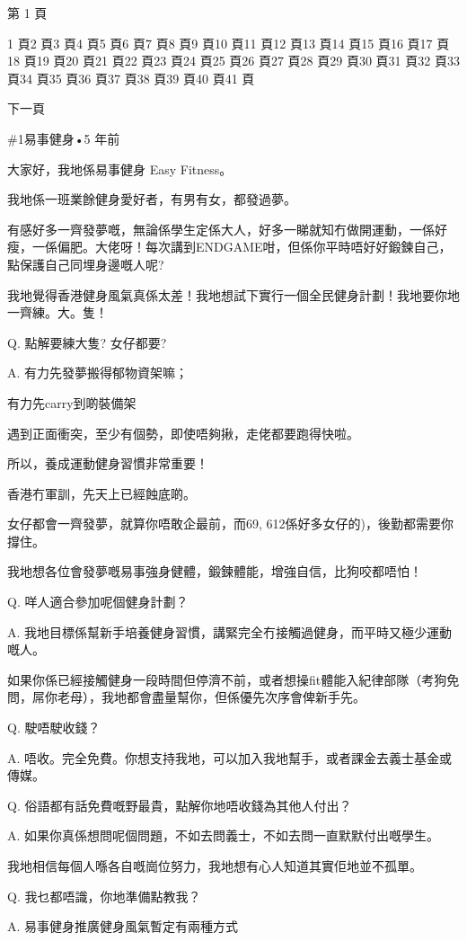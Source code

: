 第 1 頁

1 頁2 頁3 頁4 頁5 頁6 頁7 頁8 頁9 頁10 頁11 頁12 頁13 頁14 頁15 頁16 頁17 頁18 頁19 頁20 頁21 頁22 頁23 頁24 頁25 頁26 頁27 頁28 頁29 頁30 頁31 頁32 頁33 頁34 頁35 頁36 頁37 頁38 頁39 頁40 頁41 頁

下一頁

\#1易事健身•5 年前

大家好，我地係易事健身 Easy Fitness。

我地係一班業餘健身愛好者，有男有女，都發過夢。

有感好多一齊發夢嘅，無論係學生定係大人，好多一睇就知冇做開運動，一係好瘦，一係偏肥。大佬呀！每次講到ENDGAME咁，但係你平時唔好好鍛鍊自己，點保護自己同埋身邊嘅人呢?

我地覺得香港健身風氣真係太差！我地想試下實行一個全民健身計劃！我地要你地一齊練。大。隻！

Q. 點解要練大隻? 女仔都要?

A. 有力先發夢搬得郁物資架嘛；

有力先carry到啲裝備架

遇到正面衝突，至少有個勢，即使唔夠揪，走佬都要跑得快啦。

所以，養成運動健身習慣非常重要！

香港冇軍訓，先天上已經蝕底啲。

女仔都會一齊發夢，就算你唔敢企最前，而69, 612係好多女仔的)，後勤都需要你撐住。

我地想各位會發夢嘅易事強身健體，鍛鍊體能，增強自信，比狗咬都唔怕！

Q. 咩人適合參加呢個健身計劃？

A. 我地目標係幫新手培養健身習慣，講緊完全冇接觸過健身，而平時又極少運動嘅人。

如果你係已經接觸健身一段時間但停濟不前，或者想操fit體能入紀律部隊（考狗免問，屌你老母），我地都會盡量幫你，但係優先次序會俾新手先。

Q. 駛唔駛收錢？

A. 唔收。完全免費。你想支持我地，可以加入我地幫手，或者課金去義士基金或傳媒。

Q. 俗語都有話免費嘅野最貴，點解你地唔收錢為其他人付出？

A. 如果你真係想問呢個問題，不如去問義士，不如去問一直默默付出嘅學生。

我地相信每個人喺各自嘅崗位努力，我地想有心人知道其實佢地並不孤單。

Q. 我乜都唔識，你地準備點教我？

A. 易事健身推廣健身風氣暫定有兩種方式

⠀⠀⠀⠀⠀⠀⠀⠀⠀


